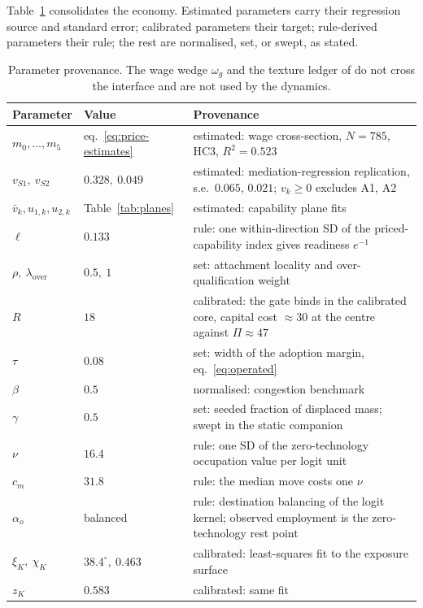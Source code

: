 \documentclass[12pt, a4paper]{article}
\begin{document}
Table~\ref{tab:provenance} consolidates the economy. Estimated
parameters carry their regression source and standard error; calibrated
parameters their target; rule-derived parameters their rule; the rest
are normalised, set, or swept, as stated.

\begin{table}[tbp]
\centering
\small
\caption{Parameter provenance. The wage wedge $\omega_g$ and the texture
ledger of \textcite{storck2026fields} do not cross the interface and are
not used by the dynamics.}
\label{tab:provenance}
\begin{tabular}{llp{7.6cm}}
\toprule
Parameter & Value & Provenance \\
\midrule
$m_0,\dots,m_5$ & eq.~\eqref{eq:price-estimates} & estimated: wage
cross-section, $N = 785$, HC3, $R^2 = 0.523$ \\
$v_{S1},\ v_{S2}$ & $0.328,\ 0.049$ & estimated: mediation-regression
replication, s.e.\ $0.065$, $0.021$; $v_k \geq 0$ excludes A1, A2 \\
$\bar v_k, u_{1,k}, u_{2,k}$ & Table~\ref{tab:planes} & estimated:
capability plane fits \\
$\ell$ & $0.133$ & rule: one within-direction SD of the
priced-capability index gives readiness $e^{-1}$ \\
$\rho,\ \lambda_{\mathrm{over}}$ & $0.5,\ 1$ & set: attachment locality
and over-qualification weight \\
$R$ & $18$ & calibrated: the gate binds in the calibrated core, capital
cost $\approx 30$ at the centre against $\Pi \approx 47$ \\
$\tau$ & $0.08$ & set: width of the adoption margin,
eq.~\eqref{eq:operated} \\
$\beta$ & $0.5$ & normalised: congestion benchmark \\
$\gamma$ & $0.5$ & set: seeded fraction of displaced mass; swept in the
static companion \\
$\nu$ & $16.4$ & rule: one SD of the zero-technology occupation value
per logit unit \\
$c_m$ & $31.8$ & rule: the median move costs one $\nu$ \\
$\alpha_o$ & balanced & rule: destination balancing of the logit
kernel; observed employment is the zero-technology rest point \\
$\xi_K,\ \chi_K$ & $38.4^\circ,\ 0.463$ & calibrated: least-squares fit
to the exposure surface \\
$z_K$ & $0.583$ & calibrated: same fit \\

\end{tabular}
\end{table}
\end{document}
